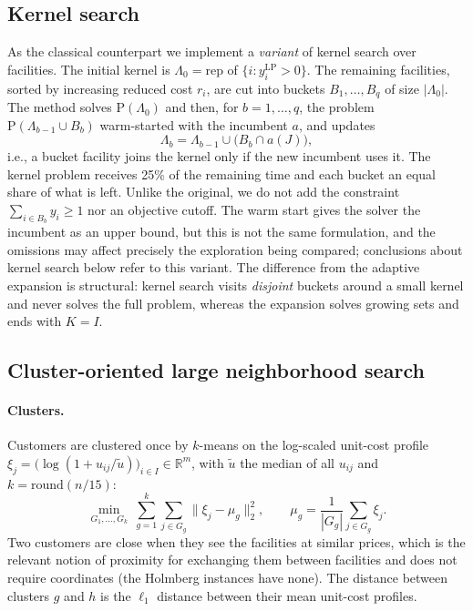 \subsection{Kernel search}\label{sec:kernel}
As the classical counterpart we implement a \emph{variant} of kernel search
\citep{guastaroba2014} over facilities.
The initial kernel is $\Lambda_0=\mathrm{rep}$ of $\{i: y^{\mathrm{LP}}_i>0\}$. The remaining
facilities, sorted by increasing reduced cost $r_i$, are cut into buckets
$B_1,\dots,B_q$ of size $|\Lambda_0|$. The method solves $\mathrm{P}(\Lambda_0)$ and then, for
$b=1,\dots,q$, the problem $\mathrm{P}(\Lambda_{b-1}\cup B_b)$ warm-started with the incumbent
$a$, and updates
\begin{equation}
\Lambda_b=\Lambda_{b-1}\cup\bigl(B_b\cap a(J)\bigr),
\end{equation}
i.e., a bucket facility joins the kernel only if the new incumbent uses it. The kernel problem
receives 25\% of the remaining time and each bucket an equal share of what is left. Unlike the
original, we do not add the constraint $\sum_{i\in B_b}y_i\ge1$ nor an objective cutoff. The
warm start gives the solver the incumbent as an upper bound, but this is not the same
formulation, and the omissions may affect precisely the exploration being compared; conclusions
about kernel search below refer to this variant. The difference from the adaptive expansion is
structural: kernel search visits \emph{disjoint} buckets around a small kernel and never solves
the full problem, whereas the expansion solves growing sets and ends with $K=I$.

\subsection{Cluster-oriented large neighborhood search}\label{sec:clns}
\paragraph{Clusters.} Customers are clustered once by $k$-means on the log-scaled unit-cost
profile $\xi_j=\bigl(\log(1+u_{ij}/\tilde u)\bigr)_{i\in I}\in\mathbb{R}^m$, with $\tilde u$ the
median of all $u_{ij}$ and $k=\mathrm{round}(n/15)$:
\begin{equation}
\min_{G_1,\dots,G_k}\ \sum_{g=1}^{k}\sum_{j\in G_g}\lVert \xi_j-\mu_g\rVert_2^2,\qquad
\mu_g=\frac{1}{|G_g|}\sum_{j\in G_g}\xi_j .
\end{equation}
Two customers are close when they see the facilities at similar prices, which is the relevant
notion of proximity for exchanging them between facilities and does not require coordinates
(the Holmberg instances have none). The distance between clusters $g$ and $h$ is the
$\ell_1$ distance between their mean unit-cost profiles.

